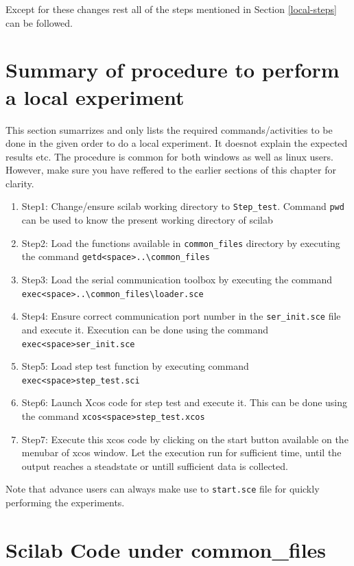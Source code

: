  Except for these changes rest all of the steps mentioned in Section \ref{local-steps} can be followed.
\section{Summary of procedure to perform a local experiment}\label{local-summary}
This section sumarrizes and only lists the required commands/activities to be done in the given order to do a local experiment. It doesnot explain the expected results etc. The procedure is common for both windows as well as linux users. However, make sure you have reffered to the earlier sections of this chapter for clarity.

\begin{enumerate}
\item Step1: Change/ensure scilab working directory to {\tt Step\_test}. Command {\tt pwd} can be used to know the present working directory of scilab
\item Step2: Load the functions available in {\tt common\_files} directory by executing the command {\tt getd<space>..\textbackslash common\_files\ }
\item Step3: Load the serial communication toolbox by executing the command {\tt exec<space>..\textbackslash common\_files\textbackslash loader.sce}
\item Step4: Ensure correct communication port number in the {\tt ser\_init.sce} file and execute it. Execution can be done using the command \\{\tt exec<space>ser\_init.sce}
\item Step5: Load step test function by executing command\\ {\tt exec<space>step\_test.sci}
\item Step6: Launch Xcos code for step test and execute it. This can be done using the command {\tt xcos<space>step\_test.xcos}
\item Step7: Execute this xcos code by clicking on the start button available on the menubar of xcos window. Let the execution run for sufficient time, until the output reaches a steadstate or untill sufficient data is collected.
\end{enumerate}

Note that advance users can always make use to {\tt start.sce} file for quickly performing the experiments.

\section{Scilab Code under common\_files}\label{commonfiles}
\begin{code}

\end{code}

